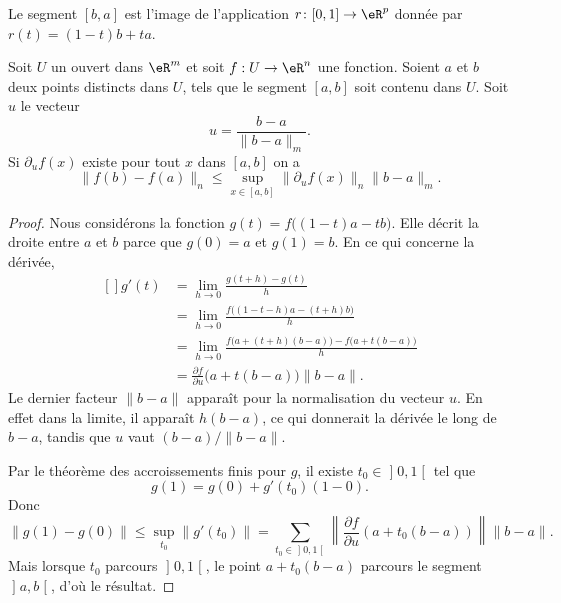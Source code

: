 Le segment $[b,a]$ est l'image de l'application $r\colon [0,1]\to \eR^p$ donnée par $r(t)=(1-t)b+ta$.

\begin{theorem}\label{val_medio_1}		
	Soit $U$ un ouvert dans $\eR^m$ et soit $f:U\to\eR^n$ une fonction. Soient $a$ et $b$ deux points distincts dans $U$, tels que le segment $[a,b]$ soit contenu dans $U$. Soit $u$ le vecteur 
	\[
		u=\frac{b-a}{\|b-a\|_m}.
	\] 
	Si $\partial_u f(x)$ existe pour tout $x$ dans $[a,b]$ on a
	\[
		\|f(b)-f(a)\|_n\leq \sup_{x\in[a,b]}\|\partial_uf(x)\|_n\|b-a\|_m.
	\]
\end{theorem}

\begin{proof}
	Nous considérons la fonction $g(t)=f\big( (1-t)a-tb \big)$. Elle décrit la droite entre $a$ et $b$ parce que $g(0)=a$ et $g(1)=b$. En ce qui concerne la dérivée,
	\begin{equation}
		\begin{aligned}[]
			g'(t)&=\lim_{h\to 0} \frac{ g(t+h)-g(t) }{ h }\\
			&=\lim_{h\to 0} \frac{ f\big( (1-t-h)a-(t+h)b \big) }{ h }\\
			&=\lim_{h\to 0} \frac{ f\big( a+(t+h)(b-a) \big)-f\big( a+t(b-a) \big) }{ h }\\
			&=\frac{ \partial f }{ \partial u }\big( a+t(b-a) \big)\| b-a \|.
		\end{aligned}
	\end{equation}
	Le dernier facteur $\| b-a \|$ apparaît pour la normalisation du vecteur $u$. En effet dans la limite, il apparaît $h(b-a)$, ce qui donnerait la dérivée le long de $b-a$, tandis que $u$ vaut $(b-a)/\| b-a \|$.

	Par le théorème des accroissements finis pour $g$, il existe $t_0\in\mathopen] 0 , 1 \mathclose[$ tel que
	\begin{equation}
		g(1)=g(0)+g'(t_0)(1-0).
	\end{equation}
	Donc
	\begin{equation}
		\| g(1)-g(0) \|\leq\sup_{t_0}\| g'(t_0) \|=\sum_{t_0\in\mathopen] 0 , 1 \mathclose[}\left\| \frac{ \partial f }{ \partial u }(a+t_0(b-a)) \right\|\| b-a \|.
	\end{equation}
	Mais lorsque $t_0$ parcours $\mathopen] 0 , 1 \mathclose[$, le point $a+t_0(b-a)$ parcours le segment $\mathopen] a , b \mathclose[$, d'où le résultat.
\end{proof}

